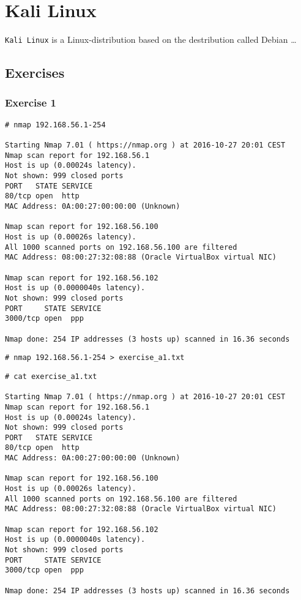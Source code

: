 \section{Kali Linux}
\texttt{Kali Linux} is a Linux-distribution based on the destribution
called Debian\cite{KALIDEBIAN} \dots

\subsection{Exercises}
\subsubsection{Exercise 1}
\begin{verbatim}
# nmap 192.168.56.1-254

Starting Nmap 7.01 ( https://nmap.org ) at 2016-10-27 20:01 CEST
Nmap scan report for 192.168.56.1
Host is up (0.00024s latency).
Not shown: 999 closed ports
PORT   STATE SERVICE
80/tcp open  http
MAC Address: 0A:00:27:00:00:00 (Unknown)

Nmap scan report for 192.168.56.100
Host is up (0.00026s latency).
All 1000 scanned ports on 192.168.56.100 are filtered
MAC Address: 08:00:27:32:08:88 (Oracle VirtualBox virtual NIC)

Nmap scan report for 192.168.56.102
Host is up (0.0000040s latency).
Not shown: 999 closed ports
PORT     STATE SERVICE
3000/tcp open  ppp

Nmap done: 254 IP addresses (3 hosts up) scanned in 16.36 seconds
\end{verbatim}

\begin{verbatim}
# nmap 192.168.56.1-254 > exercise_a1.txt
\end{verbatim}

\begin{verbatim}
# cat exercise_a1.txt

Starting Nmap 7.01 ( https://nmap.org ) at 2016-10-27 20:01 CEST
Nmap scan report for 192.168.56.1
Host is up (0.00024s latency).
Not shown: 999 closed ports
PORT   STATE SERVICE
80/tcp open  http
MAC Address: 0A:00:27:00:00:00 (Unknown)

Nmap scan report for 192.168.56.100
Host is up (0.00026s latency).
All 1000 scanned ports on 192.168.56.100 are filtered
MAC Address: 08:00:27:32:08:88 (Oracle VirtualBox virtual NIC)

Nmap scan report for 192.168.56.102
Host is up (0.0000040s latency).
Not shown: 999 closed ports
PORT     STATE SERVICE
3000/tcp open  ppp

Nmap done: 254 IP addresses (3 hosts up) scanned in 16.36 seconds
\end{verbatim}


